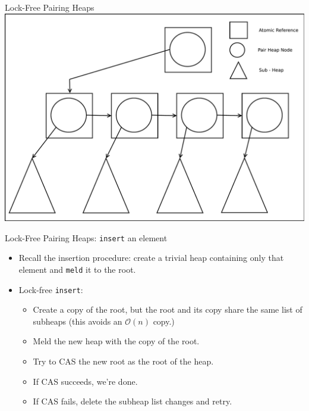 \documentclass{beamer}
\begin{document}
\begin{frame}{Lock-Free Pairing Heaps}
  \includegraphics[scale=.350]{img/pairheapLockFree.pdf}
\end{frame}

\begin{frame}{Lock-Free Pairing Heaps: \texttt{insert} an element}
  \begin{itemize}
    \item Recall the insertion procedure: create a trivial heap containing only that
      element and \texttt{meld} it to the root.
    \item Lock-free \texttt{insert}:
      \begin{itemize}
        \item Create a copy of the root, but the root and its copy share the same
          list of subheaps (this avoids an $\mathcal{O}(n)$ copy.)
        \item Meld the new heap with the copy of the root.
        \item Try to CAS the new root as the root of the heap.
        \item If CAS succeeds, we're done.
        \item If CAS fails, delete the subheap list changes and retry.
      \end{itemize}
    \end{itemize}
\end{frame}
\end{document}
